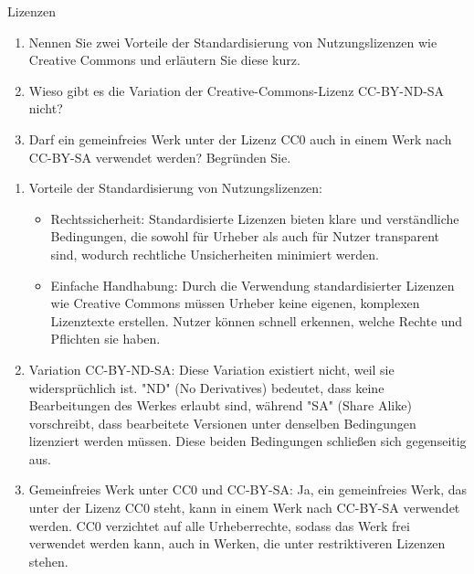 \documentclass{article}
\begin{document}
\begin{exercise}{Lizenzen}
  \begin{enumerate}
    \item Nennen Sie zwei Vorteile der Standardisierung von Nutzungslizenzen wie Creative Commons und erläutern Sie diese kurz.
    \item Wieso gibt es die Variation der Creative-Commons-Lizenz CC-BY-ND-SA nicht?
    \item Darf ein gemeinfreies Werk unter der Lizenz CC0 auch in einem Werk nach CC-BY-SA verwendet werden? Begründen Sie.
  \end{enumerate}

  \begin{solution}
    \begin{enumerate}
      \item Vorteile der Standardisierung von Nutzungslizenzen:
            \begin{itemize}
              \item Rechtssicherheit: Standardisierte Lizenzen bieten klare und verständliche Bedingungen, die sowohl für Urheber als auch für Nutzer transparent sind, wodurch rechtliche Unsicherheiten minimiert werden.
              \item Einfache Handhabung: Durch die Verwendung standardisierter Lizenzen wie Creative Commons müssen Urheber keine eigenen, komplexen Lizenztexte erstellen. Nutzer können schnell erkennen, welche Rechte und Pflichten sie haben.
            \end{itemize}
      \item Variation CC-BY-ND-SA: Diese Variation existiert nicht, weil sie widersprüchlich ist. "ND" (No Derivatives) bedeutet, dass keine Bearbeitungen des Werkes erlaubt sind, während "SA" (Share Alike) vorschreibt, dass bearbeitete Versionen unter denselben Bedingungen lizenziert werden müssen. Diese beiden Bedingungen schließen sich gegenseitig aus.
      \item Gemeinfreies Werk unter CC0 und CC-BY-SA: Ja, ein gemeinfreies Werk, das unter der Lizenz CC0 steht, kann in einem Werk nach CC-BY-SA verwendet werden. CC0 verzichtet auf alle Urheberrechte, sodass das Werk frei verwendet werden kann, auch in Werken, die unter restriktiveren Lizenzen stehen.
    \end{enumerate}
  \end{solution}
\end{exercise}
\end{document}
